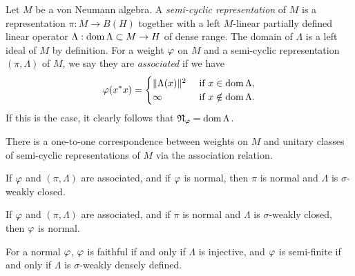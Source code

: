 \documentclass{../../large}
\begin{document}
\begin{prb}
Let $M$ be a von Neumann algebra.
A \emph{semi-cyclic representation} of $M$ is a representation $\pi:M\to B(H)$ together with a left $M$-linear partially defined linear operator $\Lambda:\operatorname{dom}\Lambda\subset M\to H$ of dense range.
The domain of $\Lambda$ is a left ideal of $M$ by definition.
For a weight $\f$ on $M$ and a semi-cyclic representation $(\pi,\Lambda)$ of $M$, we say they are \emph{associated} if we have
\[\varphi(x^*x)=\begin{cases}
\|\Lambda(x)\|^2&\text{ if }x\in\operatorname{dom}\Lambda,\\
\infty&\text{ if }x\notin\operatorname{dom}\Lambda.
\end{cases}\]
If this is the case, it clearly follows that $\mathfrak{N}_\varphi=\operatorname{dom}\Lambda$.
\begin{parts}
\item There is a one-to-one correspondence between weights on $M$ and unitary classes of semi-cyclic representations of $M$ via the association relation.
\item If $\f$ and $(\pi,\Lambda)$ are associated, and if $\f$ is normal, then $\pi$ is normal and $\Lambda$ is $\sigma$-weakly closed.
\item If $\f$ and $(\pi,\Lambda)$ are associated, and if $\pi$ is normal and $\Lambda$ is $\sigma$-weakly closed, then $\f$ is normal.
\item For a normal $\f$, $\f$ is faithful if and only if $\Lambda$ is injective, and $\f$ is semi-finite if and only if $\Lambda$ is $\sigma$-weakly densely defined.
\iffalse
\item Suppose $(\pi,\Lambda)$ is associated to $\f$. Suppose also $\f$ is normal and $\omega$ is a normal linear functional. If $\omega=0$ whenever $\f=0$ on $\fM_\f$, then there is a unique positive self-adjoint $h$ affiliated with $\pi(M)'$ such that $\omega(x^*x)=\<h\Lambda(x),\Lambda(x)\>$ for $x\in\fN_\f$.
\item In (c), if $\f$ is faithful semi-finite normal, then $\omega$ is in fact a vector functional.
\fi
\end{parts}
\end{prb}
\end{document}
